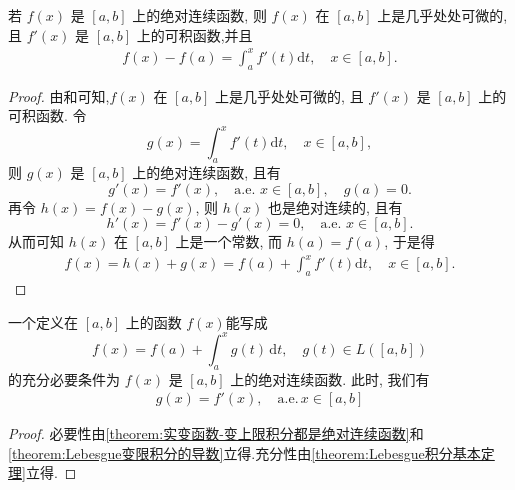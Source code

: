 \documentclass[../../main.tex]{subfiles}%
\begin{document}
\begin{theorem}[Lebesgue积分基本定理]\label{theorem:Lebesgue积分基本定理}
若 $f(x)$ 是 $[a,b]$ 上的绝对连续函数, 则 $f(x)$ 在 $[a,b]$ 上是几乎处处可微的, 且 $f'(x)$ 是 $[a,b]$ 上的可积函数,并且
\begin{align*}
f(x)-f(a) = \int_a^x f'(t)\mathrm{d}t,\quad x\in[a,b].
\end{align*}
\end{theorem}
\begin{proof}
由和可知,$f(x)$ 在 $[a,b]$ 上是几乎处处可微的, 且 $f'(x)$ 是 $[a,b]$ 上的可积函数.
令
\[
g(x) = \int_a^x f'(t)\mathrm{d}t,\quad x\in[a,b],
\]
则 $g(x)$ 是 $[a,b]$ 上的绝对连续函数, 且有
\[
g'(x) = f'(x),\quad \text{a.e. } x\in[a,b],\quad g(a)=0.
\]
再令 $h(x)=f(x)-g(x)$, 则 $h(x)$ 也是绝对连续的, 且有
\[
h'(x) = f'(x)-g'(x) = 0,\quad \text{a.e. } x\in[a,b].
\]
从而可知 $h(x)$ 在 $[a,b]$ 上是一个常数, 而 $h(a)=f(a)$, 于是得
\begin{align*}
f(x) = h(x)+g(x) 
= f(a) + \int_a^x f'(t)\mathrm{d}t,\quad x\in[a,b].
\end{align*}
\end{proof}

\begin{corollary}\label{corollary:Lebesgue积分基本定理}
一个定义在 $[a,b]$ 上的函数 $f(x)$能写成
\[
f(x) = f(a) + \int_a^x g(t)\,\mathrm{d}t,\quad g(t)\in L([a,b])
\]
的充分必要条件为 $f(x)$ 是 $[a,b]$ 上的绝对连续函数. 此时, 我们有
\begin{align*}
g(x)=f' (x),\quad \mathrm{a}.\mathrm{e}.\,x\in [a,b]
\end{align*}
\end{corollary}
\begin{proof}
必要性由\cref{theorem:实变函数-变上限积分都是绝对连续函数}和\cref{theorem:Lebesgue变限积分的导数}立得.充分性由\cref{theorem:Lebesgue积分基本定理}立得.
\end{proof}
\end{document}
